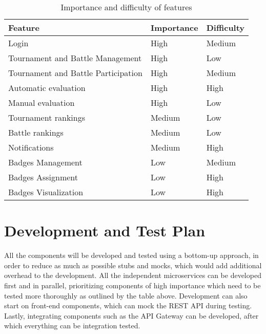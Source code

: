 \begin{table}[H]
    \centering
    \begin{tabular}{|l|l|l|}
        \hline
        \textbf{Feature}                    & \textbf{Importance} & \textbf{Difficulty} \\\hline
        Login                               & High                & Medium              \\
        Tournament and Battle Management    & High                & Low                 \\
        Tournament and Battle Participation & High                & Medium              \\
        Automatic evaluation                & High                & High                \\
        Manual evaluation                   & High                & Low                 \\
        Tournament rankings                 & Medium              & Low                 \\
        Battle rankings                     & Medium              & Low                 \\
        Notifications                       & Medium              & High                \\
        Badges Management                   & Low                 & Medium              \\
        Badges Assignment                   & Low                 & High                \\
        Badges Visualization                & Low                 & High                \\\hline
    \end{tabular}
    \caption{Importance and difficulty of features}
    \label{table:Importance and difficulty of features}
\end{table}

\section{Development and Test Plan}
All the components will be developed and tested using a bottom-up approach, in order to reduce as
much as possible stubs and mocks, which would add additional overhead to the development.
All the independent microservices can be developed first and in parallel, prioritizing components
of high importance which need to be tested more thoroughly as outlined by the table above.
Development can also start on front-end components, which can mock the REST API during testing.
Lastly, integrating components such as the API Gateway can be developed, after which everything
can be integration tested. 

